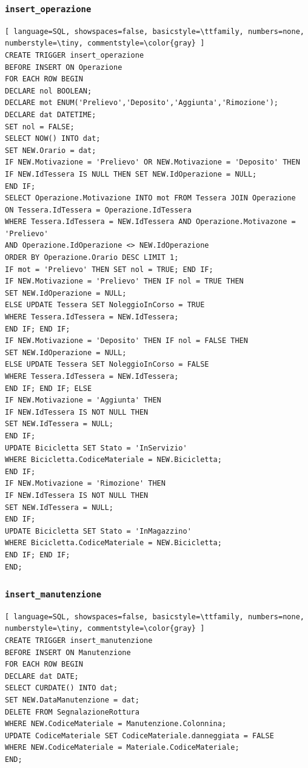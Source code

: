 \documentclass[a4paper,twoside]{article}
\begin{document}
\subsubsection{\texttt{insert\_operazione}}
\begin{lstlisting}[ language=SQL, showspaces=false, basicstyle=\ttfamily, numbers=none, numberstyle=\tiny, commentstyle=\color{gray} ]
CREATE TRIGGER insert_operazione
BEFORE INSERT ON Operazione
FOR EACH ROW BEGIN
DECLARE nol BOOLEAN;
DECLARE mot ENUM('Prelievo','Deposito','Aggiunta','Rimozione');
DECLARE dat DATETIME;
SET nol = FALSE;
SELECT NOW() INTO dat;
SET NEW.Orario = dat;
IF NEW.Motivazione = 'Prelievo' OR NEW.Motivazione = 'Deposito' THEN
IF NEW.IdTessera IS NULL THEN SET NEW.IdOperazione = NULL;
END IF;
SELECT Operazione.Motivazione INTO mot FROM Tessera JOIN Operazione
ON Tessera.IdTessera = Operazione.IdTessera
WHERE Tessera.IdTessera = NEW.IdTessera AND Operazione.Motivazone = 'Prelievo'
AND Operazione.IdOperazione <> NEW.IdOperazione
ORDER BY Operazione.Orario DESC LIMIT 1;
IF mot = 'Prelievo' THEN SET nol = TRUE; END IF;
IF NEW.Motivazione = 'Prelievo' THEN IF nol = TRUE THEN
SET NEW.IdOperazione = NULL;
ELSE UPDATE Tessera SET NoleggioInCorso = TRUE
WHERE Tessera.IdTessera = NEW.IdTessera;
END IF; END IF;
IF NEW.Motivazione = 'Deposito' THEN IF nol = FALSE THEN
SET NEW.IdOperazione = NULL;
ELSE UPDATE Tessera SET NoleggioInCorso = FALSE
WHERE Tessera.IdTessera = NEW.IdTessera;
END IF; END IF; ELSE
IF NEW.Motivazione = 'Aggiunta' THEN
IF NEW.IdTessera IS NOT NULL THEN
SET NEW.IdTessera = NULL;
END IF;
UPDATE Bicicletta SET Stato = 'InServizio'
WHERE Bicicletta.CodiceMateriale = NEW.Bicicletta;
END IF;
IF NEW.Motivazione = 'Rimozione' THEN
IF NEW.IdTessera IS NOT NULL THEN
SET NEW.IdTessera = NULL;
END IF;
UPDATE Bicicletta SET Stato = 'InMagazzino'
WHERE Bicicletta.CodiceMateriale = NEW.Bicicletta;
END IF; END IF;
END;
\end{lstlisting}
\subsubsection{\texttt{insert\_manutenzione}}
\begin{lstlisting}[ language=SQL, showspaces=false, basicstyle=\ttfamily, numbers=none, numberstyle=\tiny, commentstyle=\color{gray} ]
CREATE TRIGGER insert_manutenzione
BEFORE INSERT ON Manutenzione
FOR EACH ROW BEGIN
DECLARE dat DATE;
SELECT CURDATE() INTO dat;
SET NEW.DataManutenzione = dat;
DELETE FROM SegnalazioneRottura
WHERE NEW.CodiceMateriale = Manutenzione.Colonnina;
UPDATE CodiceMateriale SET CodiceMateriale.danneggiata = FALSE
WHERE NEW.CodiceMateriale = Materiale.CodiceMateriale;
END;
\end{lstlisting}
\end{document}
